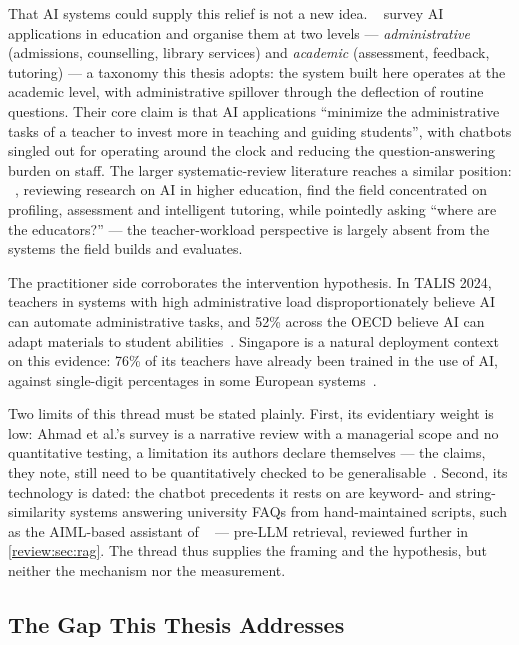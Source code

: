 That AI systems could supply this relief is not a new idea.
\citet{sust22:Ahmad}~\cite{sust22:Ahmad} survey AI applications in education
and organise them at two levels --- \emph{administrative} (admissions,
counselling, library services) and \emph{academic} (assessment, feedback,
tutoring) --- a taxonomy this thesis adopts: the system built here operates at
the academic level, with administrative spillover through the deflection of
routine questions. Their core claim is that AI applications
\enquote{minimize the administrative tasks of a teacher to invest more in
teaching and guiding students}, with chatbots singled out for operating around
the clock and reducing the question-answering burden on staff. The larger
systematic-review literature reaches a similar position:
\citet{ijethe19:ZawackiRichter}~\cite{ijethe19:ZawackiRichter}, reviewing
research on AI in higher education, find the field concentrated on
profiling, assessment and intelligent tutoring, while pointedly asking
\enquote{where are the educators?} --- the teacher-workload perspective is
largely absent from the systems the field builds and evaluates.

The practitioner side corroborates the intervention hypothesis. In TALIS 2024,
teachers in systems with high administrative load disproportionately believe
AI can automate administrative tasks, and 52\% across the OECD believe AI can
adapt materials to student abilities~\cite{oecd25:Talis}. Singapore is a
natural deployment context on this evidence: 76\% of its teachers have already
been trained in the use of AI, against single-digit percentages in some
European systems~\cite{oecd25:TalisSG}.

Two limits of this thread must be stated plainly. First, its evidentiary
weight is low: Ahmad et al.'s survey is a narrative review with a managerial
scope and no quantitative testing, a limitation its authors declare themselves
--- the claims, they note, still need to be quantitatively checked to be
generalisable~\cite{sust22:Ahmad}. Second, its technology is dated: the
chatbot precedents it rests on are keyword- and string-similarity systems
answering university FAQs from hand-maintained scripts, such as the AIML-based
assistant of \citet{icacci17:Ranoliya}~\cite{icacci17:Ranoliya} --- pre-LLM
retrieval, reviewed further in \autoref{review:sec:rag}. The thread thus
supplies the framing and the hypothesis, but neither the mechanism nor the
measurement.

\subsection{The Gap This Thesis Addresses}
\label{review:subsec:gap}

